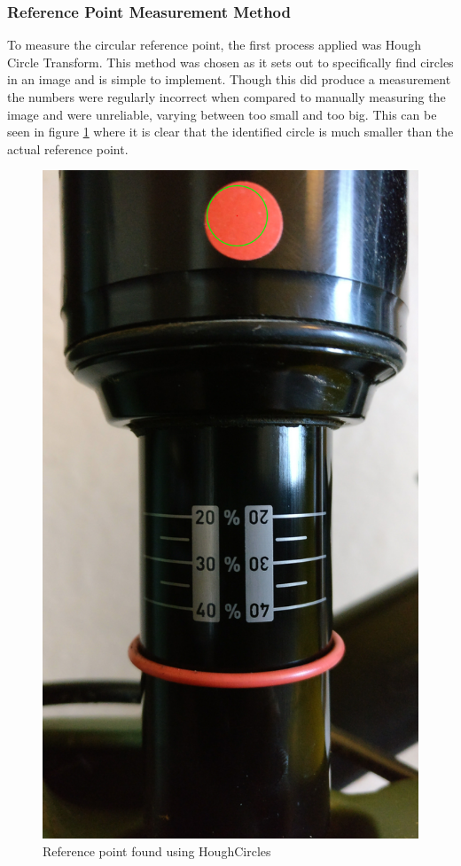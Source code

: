 	\subsubsection{Reference Point Measurement Method}
		To measure the circular reference point, the first process applied was Hough Circle Transform. This method was chosen as it sets out to specifically find circles in an image and is simple to implement. Though this did produce a measurement the numbers were regularly incorrect when compared to manually measuring the image and were unreliable, varying between too small and too big. This can be seen in figure \ref{fig:hough_circle} where it is clear that the identified circle is much smaller than the actual reference point.
		\begin{figure}[h!]
			\centering
			\includegraphics[scale=0.1,
				trim={30cm 140cm 25cm 0},
				clip]{../images/results/HoughCircles.jpg}
			\caption{Reference point found using HoughCircles}
			\label{fig:hough_circle}
		\end{figure}
